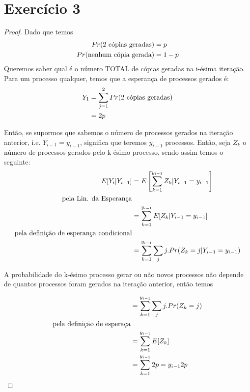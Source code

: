 \documentclass{article}
\begin{document}
\section{Exercício 3}
\begin{proof}
	Dado que temos 
	\begin{equation}
	\notag
		\begin{split}
			Pr(\text{2 cópias geradas}) &= p\\
			Pr(\text{nenhum cópia gerada}) &= 1-p
		\end{split}
	\end{equation}
	Queremos saber qual é o número TOTAL de cópias geradas na i-ésima iteração.\\

	Para um processo qualquer, temos que a esperança de processos gerados é:
	\begin{equation}
	\notag
		\begin{split}
			Y_1 &= \sum\limits_{j = 1}^{2}Pr(\text{2 cópias geradas})\\
			&= 2p
		\end{split}
	\end{equation}

	Então, se supormos que sabemos o número de processos gerados na iteração anterior, 
	i.e. $Y_{i-1} = y_{i-1}$, significa que teremos $y_{i-1}$ processos. Então,
	seja $Z_k$ o número de processos gerados pelo k-ésimo processo, sendo assim
	temos o seguinte:\\

	\begin{equation}
	\notag
		\begin{split}
			E[Y_i | Y_{i-1}] & = E\left[\sum\limits_{k=1}^{y_{i-1}}Z_k | Y_{i-1} = y_{i-1}\right]\\
			\text{pela Lin. da Esperança}&\\
			&= \sum\limits_{k=1}^{y_{i-1}}E[Z_k | Y_{i-1} = y_{i-1}]\\
			\text{pela definição de esperança condicional}&\\
			&= \sum\limits_{k=1}^{y_{i-1}}\sum\limits_j j . Pr(Z_k = j | Y_{i-1} = y_{i-1})
		\end{split}
	\end{equation}

	A probabilidade do k-ésimo processo gerar ou não novos processos não depende de quantos
	processos foram gerados na iteração anterior, então temos

	\begin{equation}
	\notag
		\begin{split}
			&=\sum\limits_{k=1}^{y_{i-1}}\sum\limits_j j . Pr(Z_k = j)\\
			\text{pela definição de esperaça}&\\
			&= \sum\limits_{k=1}^{y_{i-1}}E[Z_k]\\
			&= \sum\limits_{k=1}^{y_{i-1}}2p = y_{i-1}2p
		\end{split}
	\end{equation}


\end{proof}
\end{document}
